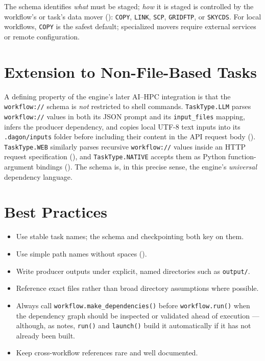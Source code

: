 The schema identifies \emph{what} must be staged; \emph{how} it is staged is
controlled by the workflow's or task's data mover
(): \texttt{COPY}, \texttt{LINK},
\texttt{SCP}, \texttt{GRIDFTP}, or \texttt{SKYCDS}. For local workflows,
\texttt{COPY} is the safest default; specialized movers require external
services or remote configuration.

\section{Extension to Non-File-Based Tasks}

A defining property of the engine's later AI--HPC integration is that the
\texttt{workflow://} schema is \emph{not} restricted to shell commands.
\texttt{TaskType.LLM} parses \texttt{workflow://} values in both its JSON
prompt and its \texttt{input\_files} mapping, infers the producer dependency,
and copies local UTF-8 text inputs into its \texttt{.dagon/inputs} folder
before including their content in the API request body
(). \texttt{TaskType.WEB} similarly parses recursive
\texttt{workflow://} values inside an HTTP request specification
(), and \texttt{TaskType.NATIVE} accepts them as Python
function-argument bindings (). The schema is, in this
precise sense, the engine's \emph{universal} dependency language.

\section{Best Practices}

\begin{itemize}[leftmargin=1.4em]
  \item Use stable task names; the schema and checkpointing both key on them.
  \item Use simple path names without spaces ().
  \item Write producer outputs under explicit, named directories such as
    \texttt{output/}.
  \item Reference exact files rather than broad directory assumptions where
    possible.
  \item Always call \texttt{workflow.make\_dependencies()} before
    \texttt{workflow.run()} when the dependency graph should be inspected or
    validated ahead of execution --- although, as  notes,
    \texttt{run()} and \texttt{launch()} build it automatically if it has
    not already been built.
  \item Keep cross-workflow references rare and well documented.
\end{itemize}

